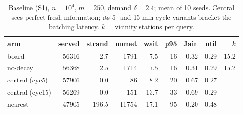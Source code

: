\begin{table}
\centering
\caption{Baseline (S1), $n=10^4$, $m=250$, demand $\delta=2.4$; mean of
10 seeds.  Central sees perfect fresh information; its 5- and 15-min
cycle variants bracket the batching latency.  $k$ = vicinity stations
per query.}
\label{tab:e1}
\begin{tabular}{@{}lrrrrrrrr@{}}
\toprule
arm & served & strand & unmet & wait & p95 & Jain & util & $k$ \\
\midrule
board & 56316 & 2.7 & 1791 & 7.5 & 16 & 0.32 & 0.29 & 15.2 \\
no-decay & 56368 & 2.5 & 1714 & 7.5 & 16 & 0.31 & 0.29 & 15.2 \\
central (cyc5) & 57906 & 0.0 & 86 & 8.2 & 20 & 0.67 & 0.27 & -- \\
central (cyc15) & 56269 & 0.0 & 151 & 13.7 & 33 & 0.69 & 0.29 & -- \\
nearest & 47905 & 196.5 & 11754 & 17.1 & 95 & 0.20 & 0.48 & -- \\
\bottomrule
\end{tabular}
\end{table}
